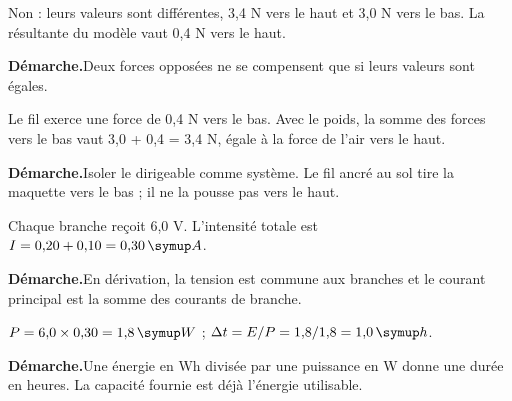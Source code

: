 \par\noindent\begin{minipage}{\linewidth}Non : leurs valeurs sont différentes, 3,4 N vers le haut et 3,0 N vers le bas. La résultante du modèle vaut 0,4 N vers le haut.\par\smallskip\textbf{Démarche.}\enspace Deux forces opposées ne se compensent que si leurs valeurs sont égales.\par{}\end{minipage}\par
\par\noindent\begin{minipage}{\linewidth}Le fil exerce une force de 0,4 N vers le bas. Avec le poids, la somme des forces vers le bas vaut 3,0 + 0,4 = 3,4 N, égale à la force de l’air vers le haut.\par\smallskip\textbf{Démarche.}\enspace Isoler le dirigeable comme système. Le fil ancré au sol tire la maquette vers le bas ; il ne la pousse pas vers le haut.\par{}\end{minipage}\par
{}
\par\noindent\begin{minipage}{\linewidth}Chaque branche reçoit 6,0 V. L’intensité totale est $I=0{,}20+0{,}10=0{,}30\unite A$.\par\smallskip\textbf{Démarche.}\enspace En dérivation, la tension est commune aux branches et le courant principal est la somme des courants de branche.\par{}\end{minipage}\par
\par\noindent\begin{minipage}{\linewidth}$P=6{,}0\times0{,}30=1{,}8\unite W$ ; $\Delta t=E/P=1{,}8/1{,}8=1{,}0\unite h$.\par\smallskip\textbf{Démarche.}\enspace Une énergie en Wh divisée par une puissance en W donne une durée en heures. La capacité fournie est déjà l’énergie utilisable.\par{}\end{minipage}\par
